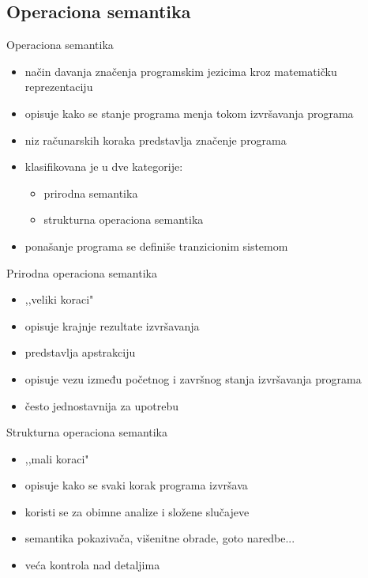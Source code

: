 \documentclass{beamer}
\begin{document}
\subsection{Operaciona semantika}
\begin{frame}{Operaciona semantika}
 	\begin{itemize}
  		\item način davanja značenja programskim jezicima kroz matematičku reprezentaciju
		\item opisuje kako se stanje programa menja tokom izvršavanja programa
		\item niz računarskih koraka predstavlja značenje programa
		\item klasifikovana je u dve kategorije: 
			\begin{itemize}
				\item prirodna semantika
				\item strukturna operaciona semantika
			\end{itemize}
		\item ponašanje programa se definiše tranzicionim sistemom
 	\end{itemize}
\end{frame}

\begin{frame}{Prirodna operaciona semantika}
	\begin{itemize}
 	\item ,,veliki koraci"
 	\item opisuje krajnje rezultate izvršavanja
 	\item predstavlja apstrakciju
 	\item opisuje vezu između početnog i završnog stanja izvršavanja programa
 	\item često jednostavnija za upotrebu
 	\end{itemize}
\end{frame}

\begin{frame}{Strukturna operaciona semantika}
\begin{itemize}
	\item ,,mali koraci"
	\item  opisuje kako se svaki korak programa izvršava
	\item koristi se za obimne analize i složene slučajeve
	\item semantika pokazivača, višenitne obrade, goto naredbe...
	\item veća kontrola nad detaljima
	\end{itemize}
\end{frame}
\end{document}
